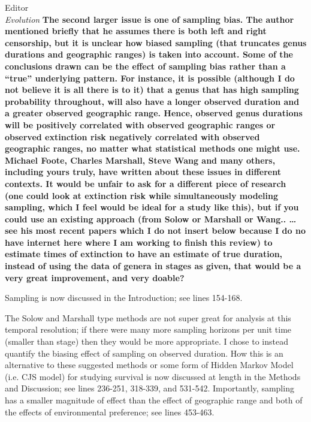 \documentclass{letter}
\begin{document}
\begin{letter}{Editor \\ \textit{Evolution}}
  \textbf{The second larger issue is one of sampling bias. The author mentioned briefly that he assumes there is both left and right censorship, but it is unclear how biased sampling (that truncates genus durations and geographic ranges) is taken into account. Some of the conclusions drawn can be the effect of sampling bias rather than a “true” underlying pattern. For instance, it is possible (although I do not believe it is all there is to it) that a genus that has high sampling probability throughout, will also have a longer observed duration and a greater observed geographic range. Hence, observed genus durations will be positively correlated with observed geographic ranges or observed extinction risk negatively correlated with observed geographic ranges, no matter what statistical methods one might use. Michael Foote, Charles Marshall, Steve Wang and many others, including yours truly, have written about these issues in different contexts. It would be unfair to ask for a different piece of research (one could look at extinction risk while simultaneously modeling sampling, which I feel would be ideal for a study like this), but if you could use an existing approach (from Solow or Marshall or Wang.. …see his most recent papers which I do not insert below because I do no have internet here where I am working to finish this review) to estimate times of extinction to have an estimate of true duration, instead of using the data of genera in stages as given, that would be a very great improvement, and very doable?}

  Sampling is now discussed in the Introduction; see lines 154-168. %

  The Solow and Marshall type methods are not super great for analysis at this temporal resolution; if there were many more sampling horizons per unit time (smaller than stage) then they would be more appropriate. I chose to instead quantify the biasing effect of sampling on observed duration. How this is an alternative to these suggested methods or some form of Hidden Markov Model (i.e. CJS model) for studying survival is now discussed at length in the Methods and Discussion; see lines 236-251, 318-339, and 531-542. Importantly, sampling has a smaller magnitude of effect than the effect of geographic range and both of the effects of environmental preference; see lines 453-463. %



\end{letter}
\end{document}
